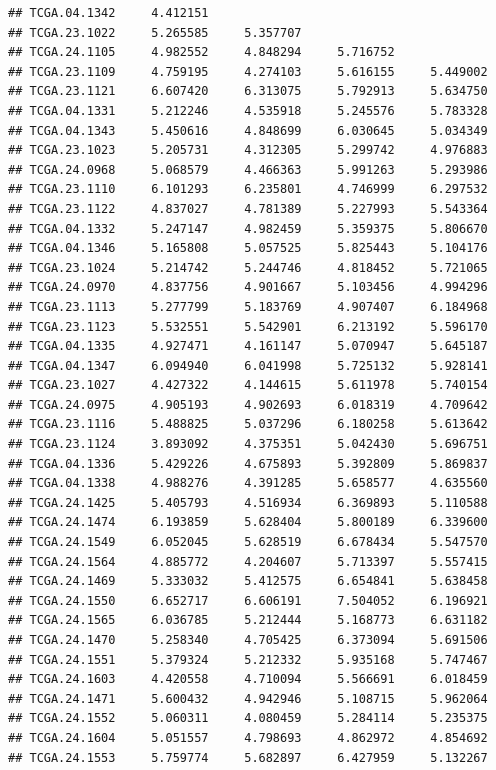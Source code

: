 \documentclass[UTF8]{beamer}\usepackage[]{graphicx}\usepackage[]{color}
\makeatletter
\newenvironment{kframe}{%
 \def\at@end@of@kframe{}%
 \ifinner\ifhmode%
  \def\at@end@of@kframe{\end{minipage}}%
  \begin{minipage}{\columnwidth}%
 \fi\fi%
 \def\FrameCommand##1{\hskip\@totalleftmargin \hskip-\fboxsep
 \colorbox{shadecolor}{##1}\hskip-\fboxsep
     \hskip-\linewidth \hskip-\@totalleftmargin \hskip\columnwidth}%
 \MakeFramed {\advance\hsize-\width
   \@totalleftmargin\z@ \linewidth\hsize
   \@setminipage}}%
 {\par\unskip\endMakeFramed%
 \at@end@of@kframe}
\newenvironment{knitrout}{}{} %
\makeatother
\begin{document}
\begin{frame}[fragile]
\begin{knitrout}
\begin{kframe}
\begin{verbatim}
## TCGA.04.1342     4.412151                                       
## TCGA.23.1022     5.265585     5.357707                          
## TCGA.24.1105     4.982552     4.848294     5.716752             
## TCGA.23.1109     4.759195     4.274103     5.616155     5.449002
## TCGA.23.1121     6.607420     6.313075     5.792913     5.634750
## TCGA.04.1331     5.212246     4.535918     5.245576     5.783328
## TCGA.04.1343     5.450616     4.848699     6.030645     5.034349
## TCGA.23.1023     5.205731     4.312305     5.299742     4.976883
## TCGA.24.0968     5.068579     4.466363     5.991263     5.293986
## TCGA.23.1110     6.101293     6.235801     4.746999     6.297532
## TCGA.23.1122     4.837027     4.781389     5.227993     5.543364
## TCGA.04.1332     5.247147     4.982459     5.359375     5.806670
## TCGA.04.1346     5.165808     5.057525     5.825443     5.104176
## TCGA.23.1024     5.214742     5.244746     4.818452     5.721065
## TCGA.24.0970     4.837756     4.901667     5.103456     4.994296
## TCGA.23.1113     5.277799     5.183769     4.907407     6.184968
## TCGA.23.1123     5.532551     5.542901     6.213192     5.596170
## TCGA.04.1335     4.927471     4.161147     5.070947     5.645187
## TCGA.04.1347     6.094940     6.041998     5.725132     5.928141
## TCGA.23.1027     4.427322     4.144615     5.611978     5.740154
## TCGA.24.0975     4.905193     4.902693     6.018319     4.709642
## TCGA.23.1116     5.488825     5.037296     6.180258     5.613642
## TCGA.23.1124     3.893092     4.375351     5.042430     5.696751
## TCGA.04.1336     5.429226     4.675893     5.392809     5.869837
## TCGA.04.1338     4.988276     4.391285     5.658577     4.635560
## TCGA.24.1425     5.405793     4.516934     6.369893     5.110588
## TCGA.24.1474     6.193859     5.628404     5.800189     6.339600
## TCGA.24.1549     6.052045     5.628519     6.678434     5.547570
## TCGA.24.1564     4.885772     4.204607     5.713397     5.557415
## TCGA.24.1469     5.333032     5.412575     6.654841     5.638458
## TCGA.24.1550     6.652717     6.606191     7.504052     6.196921
## TCGA.24.1565     6.036785     5.212444     5.168773     6.631182
## TCGA.24.1470     5.258340     4.705425     6.373094     5.691506
## TCGA.24.1551     5.379324     5.212332     5.935168     5.747467
## TCGA.24.1603     4.420558     4.710094     5.566691     6.018459
## TCGA.24.1471     5.600432     4.942946     5.108715     5.962064
## TCGA.24.1552     5.060311     4.080459     5.284114     5.235375
## TCGA.24.1604     5.051557     4.798693     4.862972     4.854692
## TCGA.24.1553     5.759774     5.682897     6.427959     5.132267

\end{verbatim}
\end{kframe}
\end{knitrout}
\end{frame}
\end{document}

